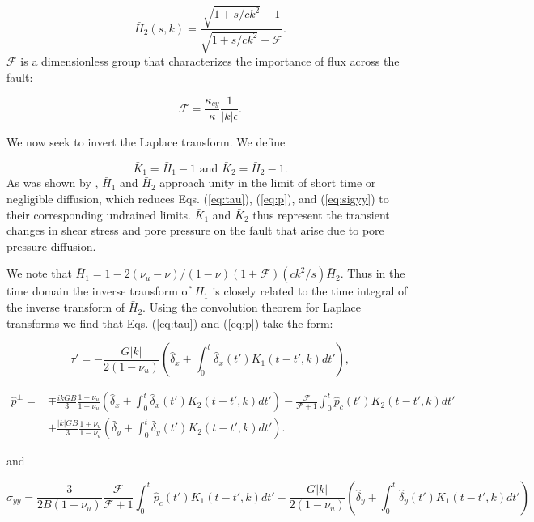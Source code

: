 \documentclass[draft]{agujournal2019}
\begin{document}
\begin{equation}
\bar{H}_2(s,k) = \frac{\sqrt{1+s/c k^2} - 1}{\sqrt{1+s/c k^2} + \mathcal{F}} .
\label{eq:H2}
\end{equation}
$\mathcal{F}$ is a dimensionless group that characterizes the importance of flux across the fault:

\begin{equation}
\mathcal{F} = \frac{\kappa_{cy}}{\kappa} \frac{1}{|k|\epsilon} .
\label{eq:F}
\end{equation}

We now seek to invert the Laplace transform. We define

\begin{equation}
    \bar{K}_1 = \bar{H}_1 - 1 \text{ and } \bar{K}_2 = \bar{H}_2 - 1.
\end{equation}
As was shown by , $\bar{H}_1$ and $\bar{H}_2$ approach unity in the limit of short time or negligible diffusion, which reduces Eqs. (\ref{eq:tau}), (\ref{eq:p}), and (\ref{eq:sigyy}) to their corresponding undrained limits. $\bar{K}_1$ and $\bar{K}_2$ thus represent the transient changes in shear stress and pore pressure on the fault that arise due to pore pressure diffusion.

We note that $\bar{H}_1 = 1 - 2 (\nu_u - \nu)/(1 - \nu) (1 + \mathcal{F}) (c k^2/s) \bar{H}_2$. Thus in the time domain the inverse transform of $\bar{H}_1$ is closely related to the time integral of the inverse transform of $\bar{H}_2$. Using the convolution theorem for Laplace transforms we find that Eqs. (\ref{eq:tau}) and (\ref{eq:p}) take the form:

\begin{equation}
\hat{\tau}' = -  \frac{G |k|}{2(1-\nu_u)} \left( \hat{\delta}_x + \int_0^t \hat{\delta}_x(t') K_1 (t - t',k) dt' \right),
\label{eq:tauIL}
\end{equation}	


\begin{align}
\hat{p}^\pm = & \mp \frac{ik  G B }{3} \frac{1+\nu_u}{1-\nu_u} \left( \hat{\delta}_x + \int_0^t \hat{\delta}_x(t') K_2 (t - t',k) dt' \right) - \frac{\mathcal{F}}{\mathcal{F} + 1} \int_0^t \hat{p}_c(t') K_2 (t - t',k) dt' \label{eq:pIL} \\ \nonumber
& + \frac{|k| G B }{3} \frac{1+\nu_u}{1-\nu_u} \left( \hat{\delta}_y + \int_0^t \hat{\delta}_y(t') K_2 (t - t',k) dt' \right).
\end{align}	

 and
 
\begin{equation}
\hat{\sigma}_{yy} = \frac{3 }{2 B (1 + \nu_u)} \frac{  \mathcal{F} }{\mathcal{F} + 1} \int_0^t \hat{p}_c(t') K_1(t-t',k) dt' - \frac{G |k| }{2(1-\nu_u)} \left( \hat{\delta}_y + \int_0^t \hat{\delta}_y(t') K_1 (t - t',k) dt' \right)
\label{eq:sigyyIL}
\end{equation}
\end{document}
